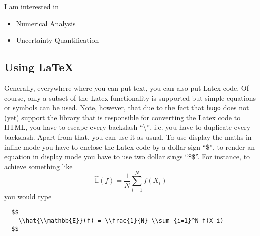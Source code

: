 \documentclass[a4paper,parskip=half]{scrartcl}
\begin{document}
\noindent I am interested in
\begin{itemize}
\item Numerical Analysis
\item Uncertainty Quantification
\end{itemize}

\subsection{Using \LaTeX}
Generally, everywhere where you can put text, you can also put Latex code.  Of
course, only a subset of the Latex functionality is supported but simple
equations or symbols can be used. Note, however, that due to the fact that
\texttt{hugo} does not (yet) support the library that is responsible for
converting the Latex code to HTML, you have to escape every backslash
``\textbackslash'', i.e. you have to duplicate every backslash. Apart from that,
you can use it as usual. To use display the maths in inline mode you have to
enclose the Latex code by a dollar sign ``\$'', to render an equation in display
mode you have to use two dollar sings ``\$\$''. For instance, to achieve
something like
\begin{equation*}
  \hat{\mathbb{E}}(f) = \frac{1}{N} \sum_{i=1}^N f(X_i)
\end{equation*}
you would type
\begin{verbatim}
  $$
    \\hat{\\mathbb{E}}(f) = \\frac{1}{N} \\sum_{i=1}^N f(X_i)
  $$
\end{verbatim}


\end{document}
